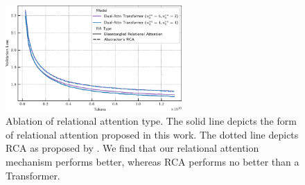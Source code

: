 \begin{figure}[ht]
    \centering
    \includegraphics[width=0.6\textwidth]{figs/experiments/tiny_stories/d64L4_ra_type_ablation_symattn_asymra.pdf}
    \caption{Ablation of relational attention type. The solid line depicts the form of relational attention proposed in this work. The dotted line depicts RCA as proposed by \citet{altabaa2024abstractors}. We find that our relational attention mechanism performs better, whereas RCA performs no better than a Transformer.}\label{fig:tinystories_ratype_ablation}
\end{figure}